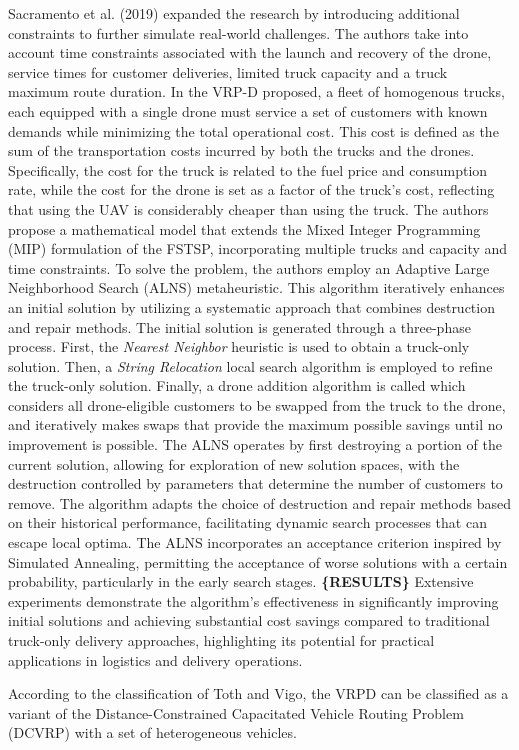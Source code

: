 \documentclass{article}
\begin{document}
	Sacramento et al. (2019) expanded the research by introducing additional constraints to further simulate real-world challenges. The authors take into account time constraints associated with the launch and recovery of the drone, service times for customer deliveries, limited truck capacity and a truck maximum route duration. In the VRP-D proposed, a fleet of homogenous trucks, each equipped with a single drone must service a set of customers with known demands while minimizing the total operational cost. This cost is defined as the sum of the transportation costs incurred by both the trucks and the drones. Specifically, the cost for the truck is related to the fuel price and consumption rate, while the cost for the drone is set as a factor of the truck's cost, reflecting that using the UAV is considerably cheaper than using the truck. The authors propose a mathematical model that extends the Mixed Integer Programming (MIP) formulation of the FSTSP, incorporating multiple trucks and capacity and time constraints. To solve the problem, the authors employ an Adaptive Large Neighborhood Search (ALNS) metaheuristic. This algorithm iteratively enhances an initial solution by utilizing a systematic approach that combines destruction and repair methods. The initial solution is generated through a three-phase process. First, the \textit{Nearest Neighbor} heuristic is used to obtain a truck-only solution. Then, a \textit{String Relocation} local search algorithm is employed to refine the truck-only solution. Finally, a drone addition algorithm is called which considers all drone-eligible customers to be swapped from the truck to the drone, and iteratively makes swaps that provide the maximum possible savings until no improvement is possible. The ALNS operates by first destroying a portion of the current solution, allowing for exploration of new solution spaces, with the destruction controlled by parameters that determine the number of customers to remove. The algorithm adapts the choice of destruction and repair methods based on their historical performance, facilitating dynamic search processes that can escape local optima. The ALNS incorporates an acceptance criterion inspired by Simulated Annealing, permitting the acceptance of worse solutions with a certain probability, particularly in the early search stages. \textbf{\{RESULTS\}} Extensive experiments demonstrate the algorithm's effectiveness in significantly improving initial solutions and achieving substantial cost savings compared to traditional truck-only delivery approaches, highlighting its potential for practical applications in logistics and delivery operations.
	\par 
	According to the classiﬁcation of Toth and Vigo, the VRPD can be classiﬁed as a variant of the Distance-Constrained Capacitated Vehicle Routing Problem (DCVRP) with a set of heterogeneous vehicles.
	\par 
	
\end{document}
